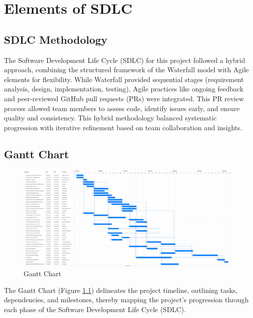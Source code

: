 \chapter{Elements of SDLC}

\section{SDLC Methodology}

The Software Development Life Cycle (SDLC) for this project followed a hybrid approach, combining the structured framework of the Waterfall model with Agile elements for flexibility. While Waterfall provided sequential stages (requirement analysis, design, implementation, testing), Agile practices like ongoing feedback and peer-reviewed GitHub pull requests (PRs) were integrated. This PR review process allowed team members to assess code, identify issues early, and ensure quality and consistency. This hybrid methodology balanced systematic progression with iterative refinement based on team collaboration and insights.

\section{Gantt Chart}

\renewcommand{\thefigure}{3.\arabic{figure}}

\begin{figure}[p]
    \centering
    \includegraphics[angle=90, width=1\textwidth, height=1\textheight, keepaspectratio]{Figures/images/gantt-chart.png}
    \caption{Gantt Chart}
    \label{fig:gantt-chart}
\end{figure}


\clearpage
The Gantt Chart (Figure \ref{fig:gantt-chart}) delineates the project timeline, outlining tasks, dependencies, and milestones, thereby mapping the project's progression through each phase of the Software Development Life Cycle (SDLC).

